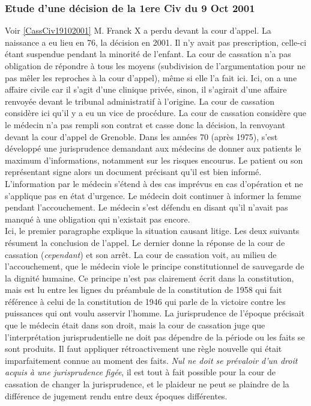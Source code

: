 \documentclass[math]{cours}
\begin{document}
\subsubsection{Etude d'une décision de la 1ere Civ du 9 Oct 2001}
	Voir \ref{CassCiv19102001}
	M. Franck X a perdu devant la cour d'appel.
	La naissance a eu lieu en 76, la décision en 2001. Il n'y avait pas prescription, celle-ci étant suspendue pendant la minorité de l'enfant.
	La cour de cassation n'a pas obligation de répondre à tous les moyens (subdivision de l'argumentation pour ne pas mêler les reproches à la cour d'appel), même si elle l'a fait ici.
	Ici, on a une affaire civile car il s'agit d'une clinique privée, sinon, il s'agirait d'une affaire renvoyée devant le tribunal administratif à l'origine.
	La cour de cassation considère ici qu'il y a eu un vice de procédure.
	La cour de cassation considère que le médecin n'a pas rempli son contrat et casse donc la décision, la renvoyant devant la cour d'appel de Grenoble.
	Dans les années 70 (après 1975), s'est développé une jurisprudence demandant aux médecins de donner aux patients le maximum d'informations, notamment sur les risques encourus.
	Le patient ou son représentant signe alors un document précisant qu'il est bien informé.
	L'information par le médecin s'étend à des cas imprévus en cas d'opération et ne s'applique pas en état d'urgence.
	Le médecin doit continuer à informer la femme pendant l'accouchement.
	Le médecin s'est défendu en disant qu'il n'avait pas manqué à une obligation qui n'existait pas encore.\\

	Ici, le premier paragraphe explique la situation causant litige.
	Les deux suivants résument la conclusion de l'appel.
	Le dernier donne la réponse de la cour de cassation (\textit{cependant}) et son arrêt.
	La cour de cassation voit, au milieu de l'accouchement, que le médecin viole le principe constitutionnel de sauvegarde de la dignité humaine.
	Ce principe n'est pas clairement écrit dans la constitution, mais est lu entre les lignes du préambule de la constitution de 1958 qui fait référence à celui de la constitution de 1946 qui parle de la victoire contre les puissances qui ont voulu asservir l'homme.
	La jurisprudence de l'époque précisait que le médecin était dans son droit, mais la cour de cassation juge que l'interprétation jurisprudentielle ne doit pas dépendre de la période ou les faits se sont produits.
	Il faut appliquer rétroactivement une règle nouvelle qui était imparfaitement connue au moment des faits.
	\textit{Nul ne doit se prévaloir d'un droit acquis à une jurisprudence figée}, il est tout à fait possible pour la cour de cassation de changer la jurisprudence,
	et le plaideur ne peut se plaindre de la différence de jugement rendu entre deux époques différentes.
\end{document}
